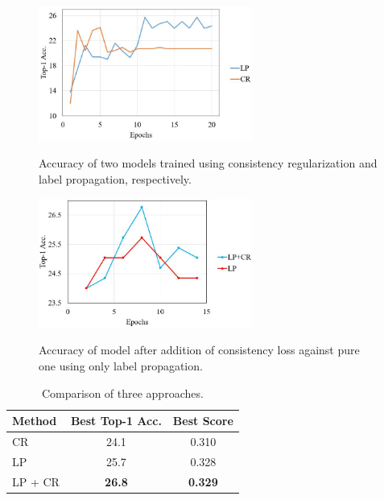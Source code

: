 \documentclass[10pt,twocolumn,letterpaper]{article}
\begin{document}
\begin{figure}
\centering
\includegraphics[width=7cm]{CRvsLP.JPG}
\label{fig:CRvsLPcomparison}
\caption{Accuracy of two models trained using consistency regularization and label propagation, respectively.}
\end{figure}

\begin{figure}
\centering
\includegraphics[width=7cm]{LPvsLP+CR.JPG}
\label{fig:LPvsLP+CRcomparison}
\caption{Accuracy of model after addition of consistency loss against pure one using only label propagation.}
\end{figure}


\begin{table}
\centering
\label{table:CRvsLPvsLPCR}
\begin{tabular}{ p{1.5cm}|c c  }
 Method & Best Top-1 Acc. & Best Score\\
 \hline
 CR & 24.1 & 0.310  \\
 LP & 25.7 & 0.328 \\
 LP + CR & \textbf{26.8} & \textbf{0.329} \\
 \hline
\end{tabular} \\ [1ex]
\caption{Comparison of three approaches.}
\end{table}
\end{document}
